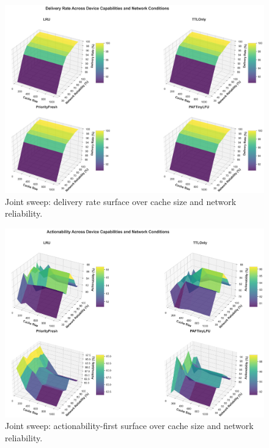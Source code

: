 \documentclass[11pt,twocolumn]{article}
\begin{document}
\begin{figure}[h]
    \centering
    \includegraphics[width=\linewidth]{figures/combined_3d_surface_deliveryRate.png}
    \caption{Joint sweep: delivery rate surface over cache size and network reliability.}
    \label{fig:combined-surface-delivery}
\end{figure}

\begin{figure}[h]
    \centering
    \includegraphics[width=\linewidth]{figures/combined_3d_surface_actionabilityFirstRatio.png}
    \caption{Joint sweep: actionability-first surface over cache size and network reliability.}
    \label{fig:combined-surface-actionability}
\end{figure}
\end{document}
